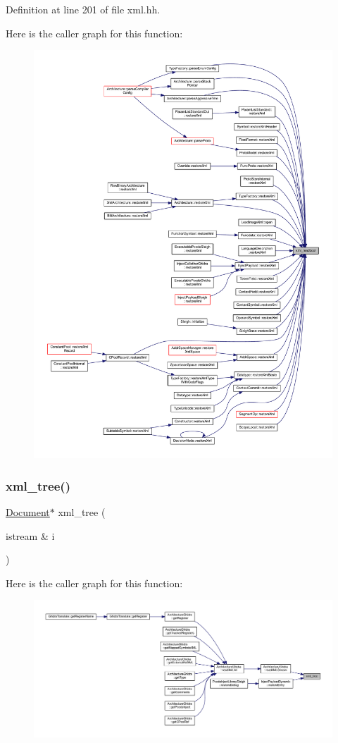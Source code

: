 Definition at line 201 of file xml.\+hh.

Here is the caller graph for this function\+:
\nopagebreak
\begin{figure}[H]
\begin{center}
\leavevmode
\includegraphics[width=350pt]{xml_8hh_ac2d01d7c2986f1143b2f6145311d093e_icgraph}
\end{center}
\end{figure}
\mbox{\label{xml_8hh_a4e0d1051f142e3711986dbb797049769}} 
\subsubsection{\texorpdfstring{xml\_tree()}{xml\_tree()}}
{\footnotesize\ttfamily \mbox{\hyperlink{class_document}{Document}}$\ast$ xml\+\_\+tree (\begin{DoxyParamCaption}\item[{istream \&}]{i }\end{DoxyParamCaption})}

Here is the caller graph for this function\+:
\nopagebreak
\begin{figure}[H]
\begin{center}
\leavevmode
\includegraphics[width=350pt]{xml_8hh_a4e0d1051f142e3711986dbb797049769_icgraph}
\end{center}
\end{figure}
